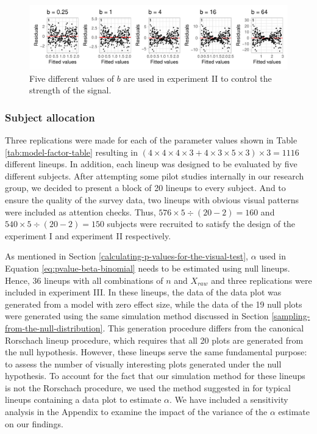 \documentclass[]{interact}
\theoremstyle{plain}%
\theoremstyle{definition}
\theoremstyle{remark}
\begin{document}
\begin{figure}

{\centering \includegraphics[width=1\linewidth]{paper_comparison_files/figure-latex/different-b-1} 

}

\caption{Five different values of $b$ are used in experiment II to control the strength of the signal.}\label{fig:different-b}
\end{figure}

\hypertarget{subject-allocation}{%
\subsubsection{Subject allocation}\label{subject-allocation}}

Three replications were made for each of the parameter values shown in
Table \ref{tab:model-factor-table} resulting in
\((4 \times 4 \times 4 \times 3 + 4 \times 3 \times 5 \times 3) \times 3 = 1116\)
different lineups. In addition, each lineup was designed to be evaluated
by five different subjects. After attempting some pilot studies
internally in our research group, we decided to present a block of 20
lineups to every subject. And to ensure the quality of the survey data,
two lineups with obvious visual patterns were included as attention
checks. Thus, \(576 \times 5 \div (20-2) = 160\) and
\(540 \times 5 \div (20-2) = 150\) subjects were recruited to satisfy
the design of the experiment I and experiment II respectively.

As mentioned in Section \ref{calculating-p-values-for-the-visual-test},
\(\alpha\) used in Equation \ref{eq:pvalue-beta-binomial} needs to be
estimated using {\textcolor{orange-red}{null}} lineups. Hence, 36
lineups with all combinations of \(n\) and \(X_{raw}\) and three
replications were included in experiment III. In these lineups, the data
of the data plot was generated from a model
{\textcolor{orange-red}{with zero effect size}}, while the data of the
19 null plots were generated using the same simulation method discussed
in Section \ref{sampling-from-the-null-distribution}.
{\textcolor{orange-red}{This generation procedure differs from the canonical Rorschach lineup procedure, which requires that all 20 plots are generated from the null hypothesis. However, these lineups serve the same fundamental purpose: to assess the number of visually interesting plots generated under the null hypothesis.}}
{\textcolor{orange-red}{To account for the fact that our simulation method for these lineups is not the Rorschach procedure,}}
we used the method suggested in \citet{vanderplas2021statistical} for
typical lineups containing a data plot to estimate \(\alpha\). We have
included a sensitivity analysis in the Appendix to examine the impact of
the variance of the \(\alpha\) estimate on our findings.
\end{document}
